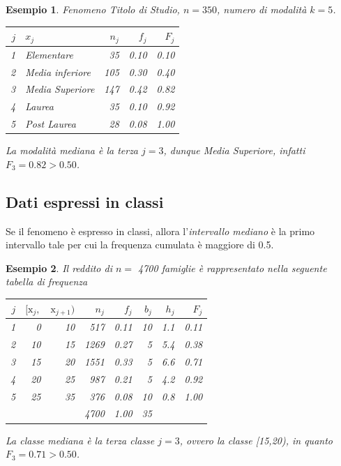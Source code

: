 \documentclass[
  11pt,
]{book}
\theoremstyle{mytheoremstyle}
\theoremstyle{mydefstyle}
\newtheorem{example}{{Esempio}}[section]
\begin{document}
\begin{example}
Fenomeno \emph{Titolo di Studio}, \(n=350\), numero di modalità \(k=5\).

\begin{table}[H]
\centering
\begin{tabular}{rlrrr}
\toprule
$j$ & $x_{j}$ & $n_j$ & $f_j$ & $F_j$\\
\midrule
1 & Elementare & 35 & 0.10 & 0.10\\
2 & Media inferiore & 105 & 0.30 & 0.40\\
3 & Media Superiore & 147 & 0.42 & 0.82\\
4 & Laurea & 35 & 0.10 & 0.92\\
5 & Post Laurea & 28 & 0.08 & 1.00\\
\bottomrule
\end{tabular}
\end{table}

La modalità mediana è la terza \(j=3\), dunque \emph{Media Superiore}, infatti \(F_3=0.82>0.50\).
\end{example}

\subsection{Dati espressi in classi}\label{dati-espressi-in-classi}

Se il fenomeno è espresso in classi, allora l'\emph{intervallo mediano} è la primo intervallo tale per cui la frequenza cumulata è maggiore di 0.5.

\begin{example}
\leavevmode

Il reddito di \(n=\) 4700 famiglie
è rappresentato nella seguente tabella di frequenza

\begin{table}[H]
\centering
\begin{tabular}{rrrrrrrr}
\toprule
$j$ & $[\text{x}_j,$ & $\text{x}_{j+1})$ & $n_j$ & $f_j$ & $b_j$ & $h_j$ & $F_j$\\
\midrule
1 & 0 & 10 & 517 & 0.11 & 10 & 1.1 & 0.11\\
2 & 10 & 15 & 1269 & 0.27 & 5 & 5.4 & 0.38\\
3 & 15 & 20 & 1551 & 0.33 & 5 & 6.6 & 0.71\\
4 & 20 & 25 & 987 & 0.21 & 5 & 4.2 & 0.92\\
5 & 25 & 35 & 376 & 0.08 & 10 & 0.8 & 1.00\\
 &  &  & 4700 & 1.00 & 35 &  & \\
\bottomrule
\end{tabular}
\end{table}

La classe mediana è la terza classe \(j=3\), ovvero la classe {[}15,20), in quanto \(F_3=0.71>0.50\).

\end{example}
\end{document}
